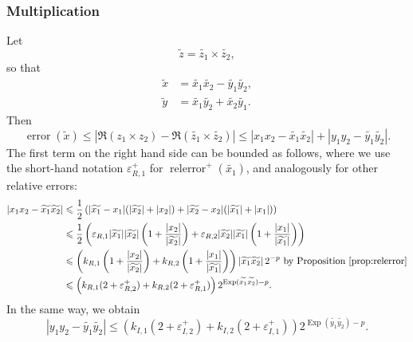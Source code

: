 \documentclass [11pt]{article}
\newcommand {\corr}[1]{{#1}}
\newcommand {\appro}[1]{\widetilde {#1}}
\DeclareMathOperator{\Exp}{\operatorname {Exp}}
\newcommand{\error}{\operatorname {error}}
\newcommand{\relerror}{\operatorname {relerror}}
\renewcommand {\epsilon}{\varepsilon}
\renewcommand {\leq}{\leqslant}
\begin{document}
\subsubsection {Multiplication}
\label {sssec:propmul}

Let
\[
\appro z = \appro {z_1} \times \appro {z_2},
\]
so that
\begin {align*}
\appro x & = \appro {x_1} \appro {x_2} - \appro {y_1} \appro {y_2}, \\
\appro y & = \appro {x_1} \appro {y_2} + \appro {x_2} \appro {y_1}.
\end {align*}
Then
\[
\error (\appro x)
\leq | \Re (\corr {z_1} \times \corr {z_2})
- \Re (\appro {z_1} \times \appro {z_2})|
\leq
| \corr {x_1} \corr {x_2} - \appro {x_1} \appro {x_2}|
+ | \corr {y_1} \corr {y_2} - \appro {y_1} \appro {y_2}|.
\]
The first term on the right hand side can be bounded as follows,
where we use the short-hand notation $\epsilon_{R, 1}^+$ for
$\relerror^+ (\appro {x_1})$, and analogously for other relative errors:
\begin{align*}
| \corr {x_1} \corr {x_2} - \appro {x_1} \appro {x_2}|
& \leq
\frac{1}{2} \left(
  |\appro {x_1} - \corr {x_1}| (|\appro {x_2}| + |\corr {x_2}|)
+ |\appro {x_2} - \corr {x_2}| (|\appro {x_1}| + |\corr {x_1}|)
\right)
\\
& \leq \frac {1}{2} \left(
  \epsilon_{R, 1} |\appro {x_1}| |\appro {x_2}|
  \left( 1 + \frac {|\corr {x_2}|}{|\appro {x_2}|} \right)
+ \epsilon_{R, 2} |\appro {x_2}| |\appro {x_1}|
  \left( 1 + \frac {|\corr {x_1}|}{|\appro {x_1}|} \right)
  \right)
\\
& \leq \left(
  k_{R, 1}
  \left( 1 + \frac {|\corr {x_2}|}{|\appro {x_2}|} \right)
+ k_{R, 2}
  \left( 1 + \frac {|\corr {x_1}|}{|\appro {x_1}|} \right)
  \right) |\appro {x_1} \appro {x_2}| \, 2^{-p}
  \text { by Proposition~\ref {prop:relerror}}
\\
& \leq \left(
   k_{R, 1} (2 + \epsilon_{R, 2}^+)
   + k_{R, 2} (2 + \epsilon_{R, 1}^+)
   \right) 2^{\Exp (\appro {x_1} \appro {x_2}) - p}.
\end{align*}
In the same way, we obtain
\[
| \corr {y_1} \corr {y_2} - \appro {y_1} \appro {y_2}|
\leq \left(
   k_{I, 1} (2 + \epsilon_{I, 2}^+)
   + k_{I, 2} (2 + \epsilon_{I, 1}^+)
   \right) 2^{\Exp (\appro {y_1} \appro {y_2}) - p}.
\]
\end{document}
